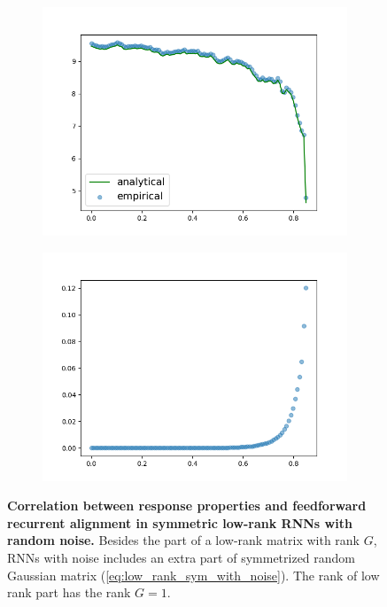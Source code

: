 \documentclass[11pt]{article}
\begin{document}
\begin{figure}[H]
\begin{subfigure}[b]{0.45\textwidth}
				\caption{}
			\end{subfigure}
			\newline
			\begin{subfigure}[b]{0.45\textwidth}
				\centering
				\includegraphics[width=\textwidth]{../figures/dim_low_rank_sym_with_noise.png}
				\caption{}
			\end{subfigure}
			\hfill
			\begin{subfigure}[b]{0.45\textwidth}
				\centering
				\includegraphics[width=\textwidth]{../figures/spont_align_low_rank_sym_with_noise.png}
				\caption{}
			\end{subfigure}
		\caption{\textbf{Correlation between response properties and feedforward recurrent alignment in symmetric low-rank RNNs with random noise.} Besides the part of a low-rank matrix with rank $G$, RNNs with noise includes an extra part of symmetrized random Gaussian matrix (\ref{eq:low_rank_sym_with_noise}). The rank of low rank part has the rank $G=1$.\\
}
\end{figure}
\end{document}
